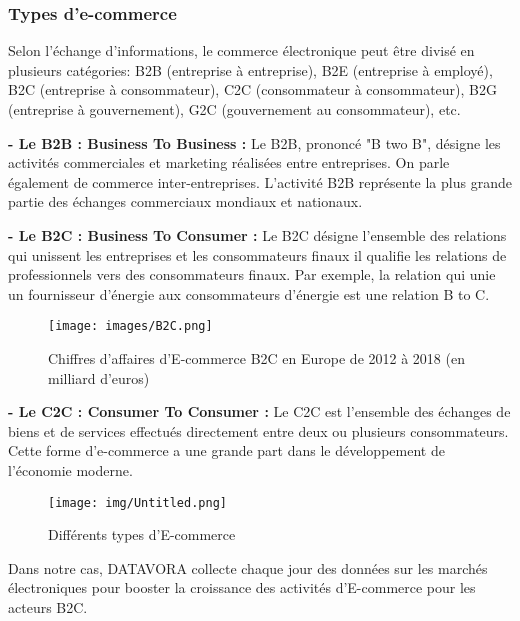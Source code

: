 \subsubsection{Types d’e-commerce}
Selon l'échange d'informations, le commerce électronique peut être divisé en plusieurs catégories: B2B (entreprise à entreprise), B2E (entreprise à employé), B2C (entreprise à consommateur), C2C (consommateur à consommateur), B2G (entreprise à gouvernement), G2C (gouvernement au consommateur), etc.

\vspace{1cm}
\textbf{- Le B2B : Business To Business \cite{B2B} :}
 Le B2B, prononcé "B two B", désigne les activités commerciales et marketing réalisées entre entreprises. On parle également de commerce inter-entreprises.
L'activité B2B représente la plus grande partie des échanges commerciaux mondiaux et nationaux.
\vspace{1cm}

\textbf{- Le B2C : Business To Consumer \cite{B2C} :}
 Le B2C désigne l'ensemble des relations qui unissent les entreprises et les consommateurs finaux il qualifie les relations de professionnels vers des consommateurs finaux. Par exemple, la relation qui unie un fournisseur d'énergie aux consommateurs d'énergie est une relation B to C.

 \begin{figure}[H]
    \centering
    \texttt{[image: images/B2C.png]}
    \caption{Chiffres d'affaires d'E-commerce B2C en Europe de 2012 à 2018 (en milliard d'euros) \cite{stat}}
    \label{fig:Global}  
    \end{figure}
 \vspace{1cm}
 
 \textbf{- Le C2C : Consumer To Consumer \cite{C2C} :} 
 Le C2C est l'ensemble des échanges de biens et de services effectués directement entre deux ou plusieurs consommateurs. Cette forme d’e-commerce a une grande part dans le développement de l’économie moderne.
  \vspace{0.5cm}
\begin{figure}[H]
    \centering
    \texttt{[image: img/Untitled.png]}
    \caption{Différents types d'E-commerce}
    \label{fig:Global}  
    \end{figure}
\vspace{0.5cm}
Dans notre cas, DATAVORA collecte chaque jour des données sur les marchés électroniques pour booster la croissance des activités d'E-commerce pour les acteurs B2C.

